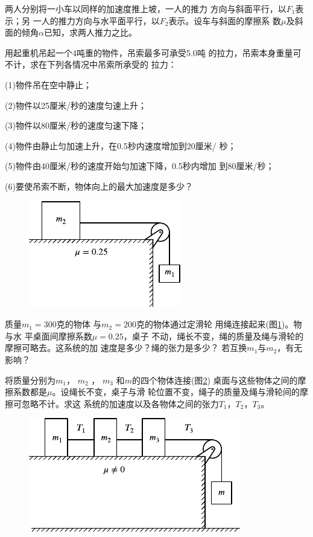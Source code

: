 \begin{exercises}
\exercise 两人分别将一小车以同样的加速度推上坡，一人的推力
方向与斜面平行，以$ F_1 $表示；另
一人的推力方向与水平面平行，以$ F_2 $表示。设车与斜面的摩擦系
数$ \mu $及斜面的倾角$ \alpha $已知，求两人推力之比。

\exercise 用起重机吊起一个4吨重的物件，吊索最多可承受5.0吨
的拉力，吊索本身重量可不计，求在下列各情况中吊索所承受的
拉力：

(1)物件吊在空中静止；

(2)物件以25厘米/秒的速度匀速上升；

(3)物件以80厘米/秒的速度匀速下降；

(4)物件由静止匀加速上升，在0.5秒内速度增加到20厘米/
秒；

(5)物件由40厘米/秒的速度开始匀加速下降，0.5秒内增加
到80厘米/秒；

(6)要使吊索不断，物体向上的最大加速度是多少？

\begin{figure}
  \centering
  \includegraphics{figure/fig03.26}
  \caption{}
  \label{fig:03.26}
\end{figure}
\exercise 质量$ m _ { 1 } = 3 0 0 $克的物体
与$ m _ { 2 } = 2 0 0 $克的物体通过定滑轮
用绳连接起来(图\ref{fig:03.26})。物与水
平桌面间摩擦系数$ \mu = 0 . 2 5 $，桌子
不动，绳长不变，绳的质量及绳与滑轮的摩擦可略去。这系统的加
速度是多少？绳的张力是多少？
若互换$ m_1 $与$ m_2 $，有无影响？

\exercise 将质量分别为$ m_1 $， $ m _ { 2 } $ ， $m _ { 3 }$ 和$ m $的四个物体连接(图\ref{fig:03.27})
桌面与这些物体之间的摩擦系数都是$ \mu $。设绳长不变，桌子与滑
轮位置不变，绳子的质量及绳与滑轮间的摩擦可忽略不计。求这
系统的加速度以及各物体之间的张力$ T _ { 1 } $，$ T _ { 2 } $，$ T _ { 3 } $。
\begin{figure}[h]
  \centering
  \includegraphics{figure/fig03.27}
  \caption{}
  \label{fig:03.27}
\end{figure}


\end{exercises}
